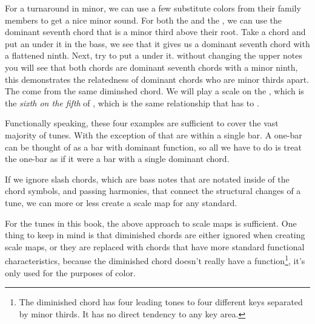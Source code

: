 
For a turnaround in minor, we can use a few substitute colors from their family members to get a nice minor sound. For both the  and the , we can use the dominant seventh chord that is a minor third above their root. Take a  chord and put an  under it in the bass, we see that it gives us a dominant seventh chord with a flattened ninth. Next, try to put a  under it.  without changing the upper notes you will see that both chords are dominant seventh chords with a minor ninth, this demonstrates the relatedness of dominant chords who are minor thirds apart. The come from the same diminshed chord. We will play a  scale on the , which is the \emph{sixth on the fifth} of , which is the same relationship that  has to .


Functionally speaking, these four examples are sufficient to cover the vast majority of tunes. With the exception of \twoFives that are within a single bar. A one-bar \twoFive can be thought of as a bar with dominant function, so all we have to do is treat the one-bar \twoFive as if it were a bar with a single dominant chord.


If we ignore slash chords, which are bass notes that are notated inside of the chord symbols, and passing harmonies, that connect the structural changes of a tune, we can more or less create a scale map for any standard.

For the tunes in this book, the above approach to scale maps is sufficient. One thing to keep in mind is that diminished chords are either ignored when creating scale maps, or they are replaced with chords that have more standard functional characteristics, because the diminished chord doesn't really have a function\footnote{The diminished chord has four leading tones to four different keys separated by minor thirds. It has no direct tendency to any key area.}, it's only used for the purposes of color.
